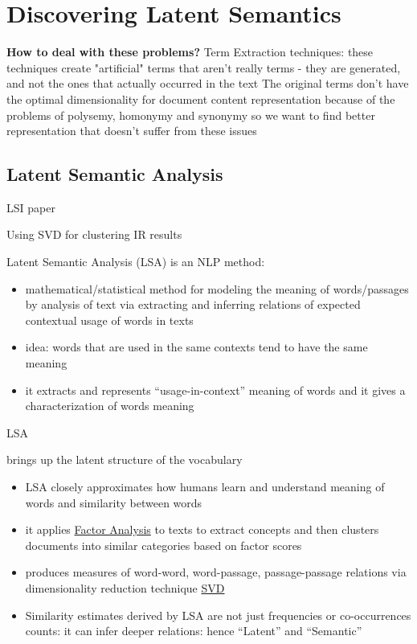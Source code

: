 \section{Discovering Latent Semantics}


\textbf{How to deal with these problems?} Term Extraction techniques:
these techniques create "artificial" terms that aren't really terms - they are generated, and not the ones that actually occurred in the text
The original terms don't have the optimal dimensionality for document content representation
because of the problems of polysemy, homonymy and synonymy
so we want to find better representation that doesn't suffer from these issues


\subsection{Latent Semantic Analysis} \label{sec:lsa}

LSI paper \cite{deerwester1990indexing}

Using SVD for clustering IR results \cite{osinski2004lingo}

Latent Semantic Analysis (LSA) is an NLP method:

\begin{itemize}
\itemsep1pt\parskip0pt
\item
  mathematical/statistical method for modeling the meaning of
  words/passages by analysis of text via extracting and inferring
  relations of expected contextual usage of words in texts
\item
  idea: words that are used in the same contexts tend to have the same
  meaning
\item
  it extracts and represents ``usage-in-context'' meaning of words and
  it gives a characterization of words meaning
\end{itemize}

LSA


brings up the latent structure of the vocabulary

\begin{itemize}
\itemsep1pt\parskip0pt
\item
  LSA closely approximates how humans learn and understand meaning of
  words and similarity between words
\item
  it applies \href{Factor Analysis}{Factor Analysis} to texts to extract
  concepts and then clusters documents into similar categories based on
  factor scores
\item
  produces measures of word-word, word-passage, passage-passage
  relations via dimensionality reduction technique \url{SVD}
\item
  Similarity estimates derived by LSA are not just frequencies or
  co-occurrences counts: it can infer deeper relations: hence ``Latent''
  and ``Semantic''
\end{itemize}

